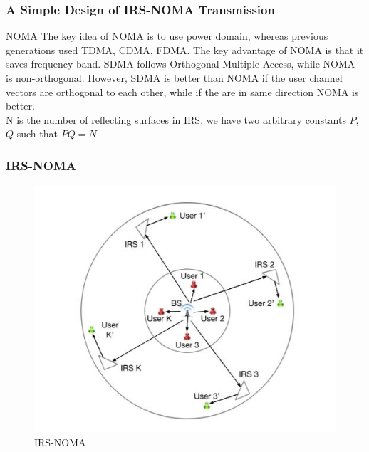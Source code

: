 \documentclass{beamer}
\begin{document}
\begin{frame}
\frametitle{A Simple Design of IRS-NOMA Transmission}
\begin{block}{NOMA}
The key idea of NOMA is to use power domain, whereas previous generations used TDMA, CDMA, FDMA. The key advantage of NOMA is that it saves frequency band. SDMA follows Orthogonal Multiple Access, while NOMA is non-orthogonal. However, SDMA is better than NOMA if the user channel vectors are orthogonal to each other, while if the are in same direction NOMA is better. \\
N is the number of reflecting surfaces in IRS, we have two arbitrary constants $P$, $Q$ such that $PQ=N$

\end{block}
\end{frame}
\begin{frame}
\frametitle{IRS-NOMA}
\begin{figure}[H]
\centering
\includegraphics[width=.75\linewidth]{figure/irs-noma}
\caption{IRS-NOMA}
\label{plot:irs-noma}
\end{figure}
\end{frame}
\end{document}
